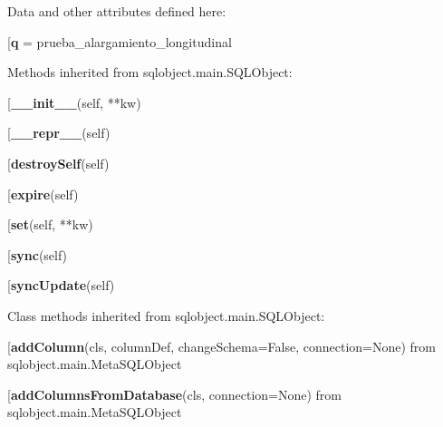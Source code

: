 Data and other attributes defined here:\\
\begin{description}\item[{\bf q} = prueba\_alargamiento\_longitudinal\end{description}


Methods inherited from sqlobject.main.SQLObject:\\
\begin{description}\item[{\bf \_\_init\_\_}(self, **kw)\end{description}

\begin{description}\item[{\bf \_\_repr\_\_}(self)\end{description}

\begin{description}\item[{\bf destroySelf}(self)\end{description}

\begin{description}\item[{\bf expire}(self)\end{description}

\begin{description}\item[{\bf set}(self, **kw)\end{description}

\begin{description}\item[{\bf sync}(self)\end{description}

\begin{description}\item[{\bf syncUpdate}(self)\end{description}


Class methods inherited from sqlobject.main.SQLObject:\\
\begin{description}\item[{\bf addColumn}(cls, columnDef, changeSchema=False, connection=None) from sqlobject.main.MetaSQLObject\end{description}

\begin{description}\item[{\bf addColumnsFromDatabase}(cls, connection=None) from sqlobject.main.MetaSQLObject\end{description}

